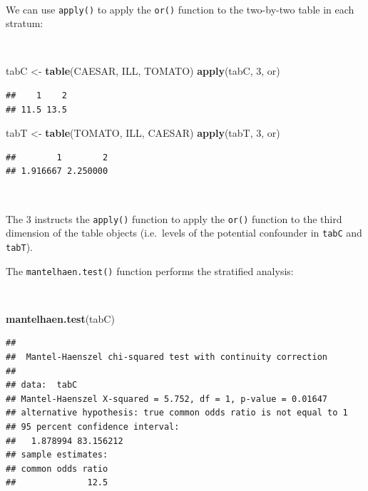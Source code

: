 \documentclass[12pt,a4paper]{book}
\newenvironment{Shaded}{\begin{snugshade}}{\end{snugshade}}
\newcommand{\DecValTok}[1]{\textcolor[rgb]{0.00,0.00,0.81}{#1}}
\newcommand{\KeywordTok}[1]{\textcolor[rgb]{0.13,0.29,0.53}{\textbf{#1}}}
\newcommand{\NormalTok}[1]{#1}
\newcommand{\StringTok}[1]{\textcolor[rgb]{0.31,0.60,0.02}{#1}}
\theoremstyle{definition}
\theoremstyle{definition}
\theoremstyle{definition}
\theoremstyle{remark}
\begin{document}
~

We can use \texttt{apply()} to apply the \texttt{or()} function to the
two-by-two table in each stratum:

~

\begin{Shaded}
\begin{Highlighting}[]
\NormalTok{tabC <-}\StringTok{ }\KeywordTok{table}\NormalTok{(CAESAR, ILL, TOMATO)}
\KeywordTok{apply}\NormalTok{(tabC, }\DecValTok{3}\NormalTok{, or)}
\end{Highlighting}
\end{Shaded}

\begin{verbatim}
##    1    2 
## 11.5 13.5
\end{verbatim}

\begin{Shaded}
\begin{Highlighting}[]
\NormalTok{tabT <-}\StringTok{ }\KeywordTok{table}\NormalTok{(TOMATO, ILL, CAESAR)}
\KeywordTok{apply}\NormalTok{(tabT, }\DecValTok{3}\NormalTok{, or)}
\end{Highlighting}
\end{Shaded}

\begin{verbatim}
##        1        2 
## 1.916667 2.250000
\end{verbatim}

~

The 3 instructs the \texttt{apply()} function to apply the \texttt{or()}
function to the third dimension of the table objects (i.e.~levels of the
potential confounder in \texttt{tabC} and \texttt{tabT}).

The \texttt{mantelhaen.test()} function performs the stratified
analysis:

~

\begin{Shaded}
\begin{Highlighting}[]
\KeywordTok{mantelhaen.test}\NormalTok{(tabC)}
\end{Highlighting}
\end{Shaded}

\begin{verbatim}
## 
##  Mantel-Haenszel chi-squared test with continuity correction
## 
## data:  tabC
## Mantel-Haenszel X-squared = 5.752, df = 1, p-value = 0.01647
## alternative hypothesis: true common odds ratio is not equal to 1
## 95 percent confidence interval:
##   1.878994 83.156212
## sample estimates:
## common odds ratio 
##              12.5
\end{verbatim}
\end{document}
